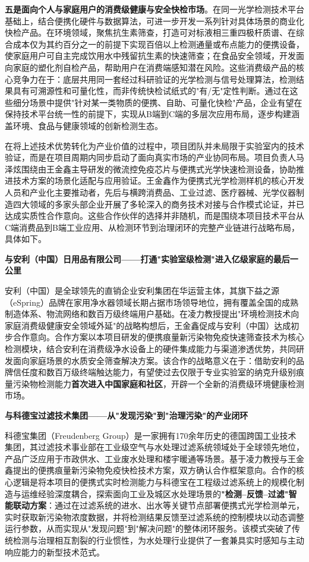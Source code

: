 \documentclass[12pt,a4paper]{article}
\begin{document}
\textbf{五是面向个人与家庭用户的消费级健康与安全快检市场}。在同一光学检测技术平台基础上，结合便携化硬件与数据算法，可进一步开发一系列针对具体场景的商业化快检产品。在环境领域，聚焦抗生素筛查，打造可对标液相三重四极杆质谱、在综合成本仅为其约百分之一的前提下实现百倍以上检测通量或布点能力的便携设备，使家庭用户可自主完成饮用水中残留抗生素的快速筛查；在食品安全领域，开发面向家庭的塑化剂自检产品，帮助用户在消费端感知潜在风险。这些消费级产品的核心竞争力在于：底层共用同一套经过科研验证的光学检测与信号处理算法，检测结果具有可溯源性和可量化性，而非传统快检试纸式的"有/无"定性判断。通过在这些细分场景中提供"针对某一类物质的便携、自助、可量化快检"产品，企业有望在保持技术平台统一性的前提下，实现从B端到C端的多层次应用布局，逐步构建涵盖环境、食品与健康领域的创新检测生态。

在将上述技术优势转化为产业价值的过程中，项目团队并未局限于实验室内的技术验证，而是在项目周期内同步启动了面向真实市场的产业协同布局。项目负责人马泽炫围绕由王金鑫主导研发的微流控免疫芯片与便携式光学快速检测设备，协助推进技术方案的场景化适配与应用验证。王金鑫作为便携式光学检测样机的核心开发人员和产业化主要推动者，先后与横跨消费品、工业过滤、医疗器械、光学仪器制造四大领域的多家头部企业开展了多轮深入的商务技术对接与合作模式论证，并已达成实质性合作意向。这些合作伙伴的选择并非随机，而是围绕本项目技术平台从C端消费品到B端工业应用、从检测环节到治理闭环的完整产业链进行战略布局，具体如下。

\textbf{与安利（中国）日用品有限公司——打通"实验室级检测"进入亿级家庭的最后一公里}

安利（中国）是全球领先的直销企业安利集团在华运营主体，其旗下益之源（eSpring）品牌在家用净水器领域长期占据市场领导地位，拥有覆盖全国的成熟制造体系、物流网络和数百万级终端用户基础。在凌力教授提出"环境检测技术向家庭消费级健康安全领域外延"的战略构想后，王金鑫促成与安利（中国）达成初步合作意向。合作方案以本项目研发的便携痕量新污染物免疫快速筛查技术为核心检测模块，结合安利在消费级净水设备上的硬件集成能力与渠道渗透优势，共同研发面向家庭场景的水质安全筛查解决方案。该合作的战略意义在于：借助安利的品牌信任度和数百万级终端触达能力，有望使过去仅限于专业实验室的纳克升级别痕量污染物检测能力\textbf{首次进入中国家庭和社区}，开辟一个全新的消费级环境健康检测市场。

\textbf{与科德宝过滤技术集团——从"发现污染"到"治理污染"的产业闭环}

科德宝集团（Freudenberg Group）是一家拥有170余年历史的德国跨国工业技术集团，其过滤技术事业部在工业级空气与水处理过滤系统领域处于全球领先地位，产品广泛应用于市政供水、工业废水处理和楼宇暖通等场景。基于凌力教授与王金鑫提出的便携痕量新污染物免疫快检技术方案，双方确认合作框架意向。合作的核心逻辑是将本项目的便携式实时检测能力与科德宝在工程级过滤系统上的规模化制造与运维经验深度耦合，探索面向工业及城区水处理场景的\textbf{"检测--反馈--过滤"智能联动方案}：通过在过滤系统的进水、出水等关键节点部署便携式光学检测单元，实时获取新污染物浓度数据，并将检测结果反馈至过滤系统的控制模块以动态调整运行参数，从而实现从"发现问题"到"解决问题"的整体闭环服务。该模式突破了传统检测与治理相互割裂的行业惯性，为水处理行业提供了一套兼具实时感知与主动响应能力的新型技术范式。
\end{document}
